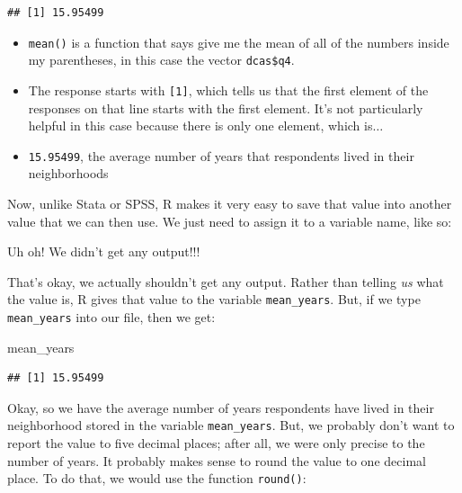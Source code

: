 \documentclass[]{article}
\newenvironment{Shaded}{\begin{snugshade}}{\end{snugshade}}
\newcommand{\KeywordTok}[1]{\textcolor[rgb]{0.13,0.29,0.53}{\textbf{{#1}}}}
\newcommand{\StringTok}[1]{\textcolor[rgb]{0.31,0.60,0.02}{{#1}}}
\newcommand{\NormalTok}[1]{{#1}}
\begin{document}
\begin{verbatim}
## [1] 15.95499
\end{verbatim}

\begin{itemize}
\item
  {\texttt{mean()}} is a function that says give me the mean of all of
  the numbers inside my parentheses, in this case the vector
  {\texttt{dcas\$q4}}.
\item
  The response starts with {\texttt{{[}1{]}}}, which tells us that the
  first element of the responses on that line starts with the first
  element. It's not particularly helpful in this case because there is
  only one element, which is\(\ldots\)
\item
  {\texttt{15.95499}}, the average number of years that respondents
  lived in their neighborhoods
\end{itemize}

Now, unlike Stata or SPSS, R makes it very easy to save that value into
another value that we can then use. We just need to assign it to a
variable name, like so:

\begin{Shaded}
\end{Shaded}

Uh oh! We didn't get any output!!!

That's okay, we actually shouldn't get any output. Rather than telling
\emph{us} what the value is, R gives that value to the variable
\texttt{mean\_years}. But, if we type \texttt{mean\_years} into our
file, then we get:

\begin{Shaded}
\begin{Highlighting}[]
\NormalTok{mean_years}
\end{Highlighting}
\end{Shaded}

\begin{verbatim}
## [1] 15.95499
\end{verbatim}

Okay, so we have the average number of years respondents have lived in
their neighborhood stored in the variable \texttt{mean\_years}. But, we
probably don't want to report the value to five decimal places; after
all, we were only precise to the number of years. It probably makes
sense to round the value to one decimal place. To do that, we would use
the function \texttt{round()}:
\end{document}
